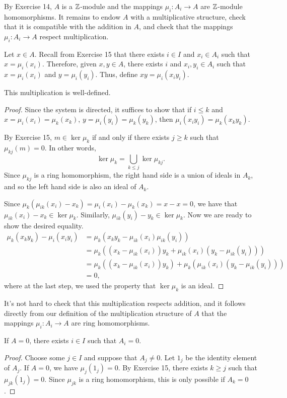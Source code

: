 \documentclass[10pt]{amsart}
\begin{document}
\begin{solution}
    By Exercise 14, $A$ is a $\mathbb{Z}$-module and the mappings $\mu_i: A_i \to A$ are $\mathbb{Z}$-module homomorphisms. It remains to endow $A$ with a multiplicative structure, check that it is compatible with the addition in $A$, and check that the mappings $\mu_i: A_i \to A$ respect multiplication.

    Let $x \in A$. Recall from Exercise 15 that there exists $i \in I$ and $x_i \in A_i$ such that $x = \mu_i(x_i)$. Therefore, given $x, y \in A$, there exists $i$ and $x_i, y_i \in A_i$ such that $x = \mu_i(x_i)$ and $y = \mu_i(y_i)$. Thus, define $xy = \mu_i(x_iy_i)$. 

    \begin{claim}
    This multiplication is well-defined. 
    \end{claim}
    \begin{proof}
    Since the system is directed, it suffices to show that if $i \leq k$ and $x = \mu_i(x_i) = \mu_k(x_k)$, $y = \mu_i(y_i) = \mu_k(y_k)$, then $\mu_i(x_iy_i) = \mu_k(x_ky_k)$. 

    By Exercise 15, $m \in \ker \mu_k$ if and only if there exists $j \geq k$ such that $\mu_{kj}(m) = 0$. In other words, \[\ker \mu_k = \bigcup_{k \leq j} \ker \mu_{kj}.\] Since $\mu_{kj}$ is a ring homomorphism, the right hand side is a union of ideals in $A_k$, and so the left hand side is also an ideal of $A_k$.

    Since $\mu_k(\mu_{ik}(x_i) - x_k) = \mu_i(x_i) - \mu_k(x_k) = x-x=0$, we have that $\mu_{ik}(x_i) - x_k \in \ker \mu_k$. Similarly, $\mu_{ik}(y_i) - y_k \in \ker \mu_k$.
    Now we are ready to show the desired equality.
    \begin{align*}
        \mu_k(x_ky_k) - \mu_i(x_iy_i) &= \mu_k(x_ky_k-\mu_{ik}(x_i)\mu_{ik}(y_i)) \\ 
        &=
        \mu_k((x_k-\mu_{ik}(x_i))y_k + 
        \mu_{ik}(x_i)(y_k-\mu_{ik}(y_i))) \\ 
        &= \mu_k((x_k-\mu_{ik}(x_i))y_k) + \mu_k(\mu_{ik}(x_i)(y_k-\mu_{ik}(y_i))) \\ 
        &= 0,
    \end{align*}
    where at the last step, we used the property that $\ker \mu_k$ is an ideal.
    \end{proof}

    It's not hard to check that this multiplication respects addition, and it follows directly from our definition of the multiplication structure of $A$ that the mappings $\mu_i: A_i \to A$ are ring homomorphisms. 

    \begin{claim} 
        If $A = 0$, there exists $i \in I$ such that $A_i = 0$.
    \end{claim}
    \begin{proof}
        Choose some $j \in I$ and suppose that $A_j \neq 0$. Let $1_j$ be the identity element of $A_j$. If $A = 0$, we have $\mu_{j}(1_j) = 0$. By Exercise 15, there exists $k \geq j$ such that $\mu_{jk}(1_j) = 0$. Since $\mu_{jk}$ is a ring homomorphism, this is only possible if $A_k = 0$.
    \end{proof}
\end{solution}
\end{document}

